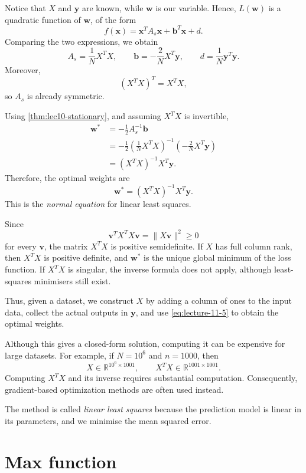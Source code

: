 Notice that \(X\) and \(\mathbf{y}\) are known, while \(\mathbf{w}\) is our variable. Hence, \(L(\mathbf{w})\) is a quadratic function of \(\mathbf{w}\), of the form
\[
	f(\mathbf{x})=\mathbf{x}^TA_s\mathbf{x}
	+\mathbf{b}^T\mathbf{x}+d.
\]
Comparing the two expressions, we obtain
\[
	A_s=\frac{1}{N}X^TX,
	\qquad
	\mathbf{b}=-\frac{2}{N}X^T\mathbf{y},
	\qquad
	d=\frac{1}{N}\mathbf{y}^T\mathbf{y}.
\]
Moreover,
\[
	(X^TX)^T=X^TX,
\]
so \(A_s\) is already symmetric.

Using \autoref{thm:lec10-stationary}, and assuming \(X^TX\) is invertible,
\[
	\begin{aligned}
		\mathbf{w}^*
		 & =-\frac{1}{2}A_s^{-1}\mathbf{b}     \\
		 & =-\frac{1}{2}
		\left(\frac{1}{N}X^TX\right)^{-1}
		\left(-\frac{2}{N}X^T\mathbf{y}\right) \\
		 & =(X^TX)^{-1}X^T\mathbf{y}.
	\end{aligned}
\]
Therefore, the optimal weights are
\begin{equation}
	\boxed{\mathbf{w}^*=(X^TX)^{-1}X^T\mathbf{y}}.
	\label{eq:lecture-11-5}
\end{equation}
This is the \emph{normal equation} for linear least squares.

Since
\[
	\mathbf{v}^TX^TX\mathbf{v}
	=\|X\mathbf{v}\|^2\geq 0
\]
for every \(\mathbf{v}\), the matrix \(X^TX\) is positive semidefinite. If \(X\) has full column rank, then \(X^TX\) is positive definite, and \(\mathbf{w}^*\) is the unique global minimum of the loss function. If \(X^TX\) is singular, the inverse formula does not apply, although least-squares minimisers still exist.

Thus, given a dataset, we construct \(X\) by adding a column of ones to the input data, collect the actual outputs in \(\mathbf{y}\), and use \autoref{eq:lecture-11-5} to obtain the optimal weights.

Although this gives a closed-form solution, computing it can be expensive for large datasets. For example, if \(N=10^6\) and \(n=1000\), then
\[
	X\in\mathbb{R}^{10^6\times1001},
	\qquad
	X^TX\in\mathbb{R}^{1001\times1001}.
\]
Computing \(X^TX\) and its inverse requires substantial computation. Consequently, gradient-based optimization methods are often used instead.

The method is called \emph{linear least squares} because the prediction model is linear in its parameters, and we minimise the mean squared error.

\section{Max function}

